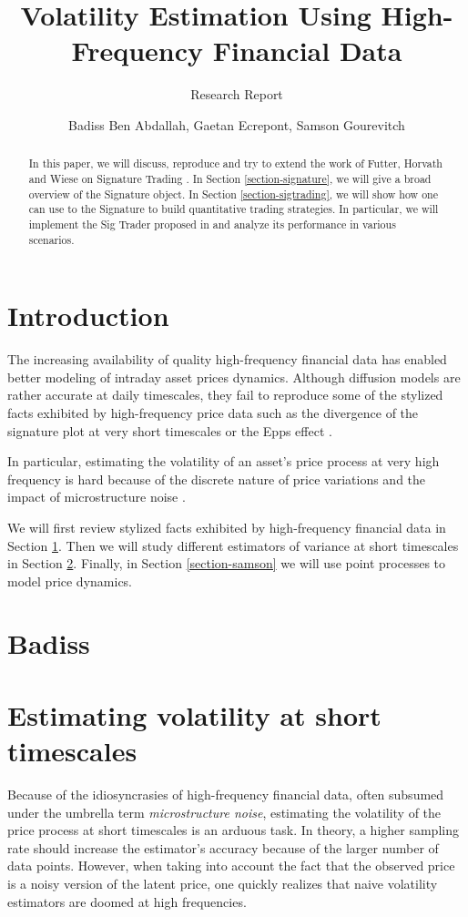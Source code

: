 \documentclass[a4paper,12pt,twoside]{article}
\author{Badiss Ben Abdallah, Gaetan Ecrepont, Samson Gourevitch}
\title{Volatility Estimation Using High-Frequency Financial Data}
\subtitle{Research Report}%
\begin{document}
	\maketitle 
	\tableofcontents

\newpage

 \begin{abstract}
    In this paper, we will discuss, reproduce and try to extend the work of Futter, Horvath and Wiese on Signature Trading \cite{main_article}. In Section \ref{section-signature}, we will give a broad overview of the Signature object. In Section \ref{section-sigtrading}, we will show how one can use to the Signature to build quantitative trading strategies. In particular, we will implement the Sig Trader proposed in \cite{main_article} and analyze its performance in various scenarios.
\end{abstract}


\section*{Introduction}
    
    The increasing availability of quality high-frequency financial data has enabled better modeling of intraday asset prices dynamics. Although diffusion models are rather accurate at daily timescales, they fail to reproduce some of the stylized facts exhibited by high-frequency price data such as the divergence of the signature plot at very short timescales \cite{signature_plot} or the Epps effect \cite{epps}.
    
    In particular, estimating the volatility of an asset's price process at very high frequency is hard because of the discrete nature of price variations and the impact of microstructure noise \cite{bacry}.

    We will first review stylized facts exhibited by high-frequency financial data in Section \ref{section-badiss}. Then we will study different estimators of variance at short timescales in Section \ref{section-gaetan}. Finally, in Section \ref{section-samson} we will use point processes to model price dynamics.

\newpage
\section{Badiss} \label{section-badiss}

\newpage

\section{Estimating volatility at short timescales} \label{section-gaetan}
Because of the idiosyncrasies of high-frequency financial data, often subsumed under the umbrella term \textit{microstructure noise}, estimating the volatility of the price process at short timescales is an arduous task. In theory, a higher sampling rate should increase the estimator's accuracy because of the larger number of data points. However, when taking into account the fact that the observed price is a noisy version of the latent price, one quickly realizes that naive volatility estimators are doomed at high frequencies.
\end{document}
